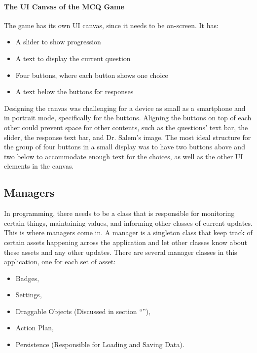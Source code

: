 \paragraph*{The \acrshort{UI} Canvas of the \acrshort{MCQ} Game}
The game has its own \acrshort{UI} canvas, since it needs to be on-screen. It has:
\begin{itemize}
\item{A slider to show progression}

\item{A text to display the current question}

\item{Four buttons, where each button shows one choice}

\item{A text below the buttons for responses}
\end{itemize}
Designing the canvas was challenging for a device as small as a smartphone and in portrait mode, specifically for the buttons. Aligning the buttons on top of each other could prevent space for other contents, such as the questions’ text bar, the slider, the response text bar, and Dr. Salem’s image. The most ideal structure for the group of four buttons in a small display was to have two buttons above and two below to accommodate enough text for the choices, as well as the other \acrshort{UI} elements in the canvas.


\subsection{Managers}
\label{ManagersSection}
In programming, there needs to be a class that is responsible for monitoring certain things, maintaining values, and informing other classes of current updates. This is where managers come in. A manager is a singleton class that keep track of certain assets happening across the application and let other classes know about these assets and any other updates. There are several manager classes in this application, one for each set of asset:

\begin{itemize}
\item{Badges,}
\item{Settings,}
\item{Draggable Objects (Discussed in section “\textbf{}”),}
\item{Action Plan,}
\item{Persistence (Responsible for Loading and Saving Data).}
\end{itemize}

